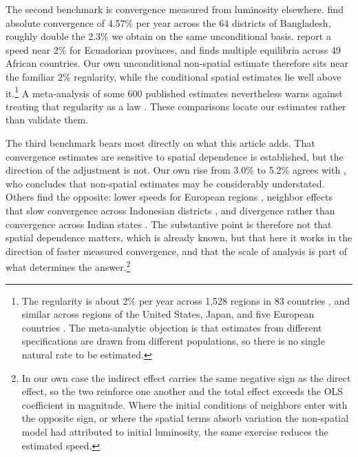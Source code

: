 \documentclass[
  a4paper, 
  twoside,
  final
]{article}
\begin{document}
The second benchmark is convergence measured from luminosity elsewhere.
\citet{basher_etal_bangladesh_lights} find absolute convergence of
4.57\% per year across the 64 districts of Bangladesh, roughly double
the 2.3\% we obtain on the same unconditional basis.
\citet{carrington_jimenez_ecuador_lights} report a speed near 2\% for
Ecuadorian provinces, and \citet{kacou_africa_convergence} finds
multiple equilibria across 49 African countries. Our own unconditional
non-spatial estimate therefore sits near the familiar 2\% regularity,
while the conditional spatial estimates lie well above it.\footnote{The
  regularity is about 2\% per year across 1,528 regions in 83 countries
  \citep{gennaioli_etal_growth_regions}, and similar across regions of
  the United States, Japan, and five European countries
  \citep{salaimartin_regional_cohesion}. The meta-analytic objection is
  that estimates from different specifications are drawn from different
  populations, so there is no single natural rate to be estimated.} A
meta-analysis of some 600 published estimates nevertheless warns against
treating that regularity as a law \citep{abreu_etal_meta_convergence}.
These comparisons locate our estimates rather than validate them.

The third benchmark bears most directly on what this article adds. That
convergence estimates are sensitive to spatial dependence is
established, but the direction of the adjustment is not. Our own rise
from 3.0\% to 5.2\% agrees with \citet{diop_africa_spillovers}, who
concludes that non-spatial estimates may be considerably understated.
Others find the opposite: lower speeds for European regions
\citep{isla_castillo_etal_eu_cohesion}, neighbor effects that slow
convergence across Indonesian districts
\citep{santos_marquez_etal_indonesia_spatial}, and divergence rather
than convergence across Indian states
\citep{lolayekar_mukhopadhyay_india_spatial}. The substantive point is
therefore not that spatial dependence matters, which is already known,
but that here it works in the direction of faster measured convergence,
and that the scale of analysis is part of what determines the
answer.\footnote{In our own case the indirect effect carries the same
  negative sign as the direct effect, so the two reinforce one another
  and the total effect exceeds the OLS coefficient in magnitude. Where
  the initial conditions of neighbors enter with the opposite sign, or
  where the spatial terms absorb variation the non-spatial model had
  attributed to initial luminosity, the same exercise reduces the
  estimated speed.}
\end{document}
